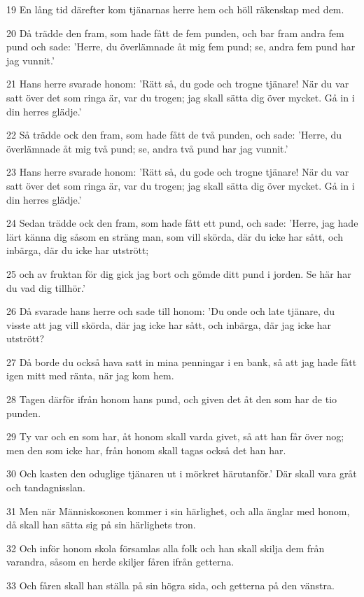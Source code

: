 \par 19 En lång tid därefter kom tjänarnas herre hem och höll räkenskap med dem.
\par 20 Då trädde den fram, som hade fått de fem punden, och bar fram andra fem pund och sade: 'Herre, du överlämnade åt mig fem pund; se, andra fem pund har jag vunnit.'
\par 21 Hans herre svarade honom: 'Rätt så, du gode och trogne tjänare! När du var satt över det som ringa är, var du trogen; jag skall sätta dig över mycket. Gå in i din herres glädje.'
\par 22 Så trädde ock den fram, som hade fått de två punden, och sade: 'Herre, du överlämnade åt mig två pund; se, andra två pund har jag vunnit.'
\par 23 Hans herre svarade honom: 'Rätt så, du gode och trogne tjänare! När du var satt över det som ringa är, var du trogen; jag skall sätta dig över mycket. Gå in i din herres glädje.'
\par 24 Sedan trädde ock den fram, som hade fått ett pund, och sade: 'Herre, jag hade lärt känna dig såsom en sträng man, som vill skörda, där du icke har sått, och inbärga, där du icke har utstrött;
\par 25 och av fruktan för dig gick jag bort och gömde ditt pund i jorden. Se här har du vad dig tillhör.'
\par 26 Då svarade hans herre och sade till honom: 'Du onde och late tjänare, du visste att jag vill skörda, där jag icke har sått, och inbärga, där jag icke har utstrött?
\par 27 Då borde du också hava satt in mina penningar i en bank, så att jag hade fått igen mitt med ränta, när jag kom hem.
\par 28 Tagen därför ifrån honom hans pund, och given det åt den som har de tio punden.
\par 29 Ty var och en som har, åt honom skall varda givet, så att han får över nog; men den som icke har, från honom skall tagas också det han har.
\par 30 Och kasten den oduglige tjänaren ut i mörkret härutanför.' Där skall vara gråt och tandagnisslan.
\par 31 Men när Människosonen kommer i sin härlighet, och alla änglar med honom, då skall han sätta sig på sin härlighets tron.
\par 32 Och inför honom skola församlas alla folk och han skall skilja dem från varandra, såsom en herde skiljer fåren ifrån getterna.
\par 33 Och fåren skall han ställa på sin högra sida, och getterna på den vänstra.
